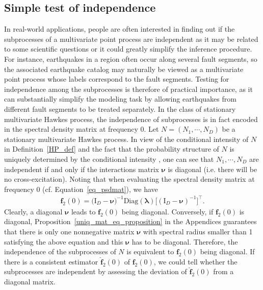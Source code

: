 \documentclass[11pt]{article}
\numberwithin{equation}{section}
\theoremstyle{plain}
\theoremstyle{definition}
\theoremstyle{definition}
\theoremstyle{assumption}
\theoremstyle{proposition}
\theoremstyle{proposition}
\theoremstyle{example}
\theoremstyle{lemma}
\theoremstyle{theorem}
\theoremstyle{remark}
\begin{document}
\subsection{Simple test of independence}\label{section_ind_test}
In real-world applications, people are often interested in finding out if the subprocesses of a multivariate point process are independent as it may be related to some scientific questions or it could greatly simplify the inference procedure. For instance, earthquakes in a region often occur along several fault segments, so the associated earthquake catalog may naturally be viewed as a multivariate point process whose labels correspond to the fault segments. Testing for independence among the subprocesses is therefore of practical importance, as it can substantially simplify the modeling task by allowing earthquakes from different fault segments to be treated separately. In the class of stationary multivariate Hawkes process, the independence of subprocesses is in fact encoded in the spectral density matrix at frequency $0$. Let $N=(N_1,\cdots,N_D)$ be a stationary multivariate Hawkes process. In view of the conditional intensity of $N$ in Definition~\ref{HP_def} and the fact that the probability structure of $N$ is uniquely determined by the conditional intensity \citep[Proposition 7.3.IV]{Daley_and_Vere-Jones2003}, one can see that $N_1,\cdots,N_D$ are independent if and only if the interactions matrix $\boldsymbol{\nu}$ is diagonal (i.e. there will be no cross-excitation). Noting that when evaluating the spectral density matrix at frequency $0$ (cf. Equation~\eqref{eq_psdmat}), we have
\begin{align*}
\boldsymbol{f}_2(0)=\big(\boldsymbol{\mathrm{I}}_D-\boldsymbol\nu\big)^{-1}\text{Diag}(\boldsymbol\lambda)\big[(\boldsymbol{\mathrm{I}}_D-\boldsymbol\nu)^{-1}\big]^{\top}.  
\end{align*}
Clearly, a diagonal $\boldsymbol{\nu}$ leads to $\boldsymbol{f}_2(0)$ being diagonal. Conversely, if $\boldsymbol{f}_2(0)$ is diagonal, Proposition~\ref{uniq_mat_eq_proposition} in the Appendices guarantees that there is only one nonnegative matrix $\boldsymbol{\nu}$ with spectral radius smaller than 1 satisfying the above equation and this $\boldsymbol{\nu}$ has to be diagonal. Therefore, the independence of the subprocesses of $N$ is equivalent to $\boldsymbol{f}_2(0)$ being diagonal. If there is a consistent estimator $\hat{\boldsymbol{f}}_2(0)$ of $\boldsymbol{f}_2(0)$, we could tell whether the subprocesses are independent by assessing the deviation of $\hat{\boldsymbol{f}}_2(0)$ from a diagonal matrix.
\end{document}
